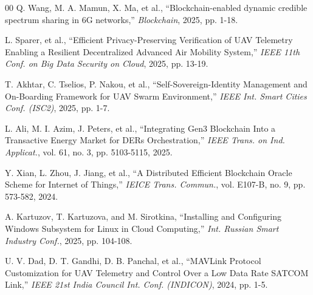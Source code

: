 \documentclass[preprint,12pt]{elsarticle}
\begin{document}
\begin{thebibliography}{00}
 Q. Wang, M. A. Mamun, X. Ma, et al., ``Blockchain-enabled dynamic credible spectrum sharing in 6G networks,'' \textit{Blockchain}, 2025, pp. 1-18.

 L. Sparer, et al., ``Efficient Privacy-Preserving Verification of UAV Telemetry Enabling a Resilient Decentralized Advanced Air Mobility System,'' \textit{IEEE 11th Conf. on Big Data Security on Cloud}, 2025, pp. 13-19.

 T. Akhtar, C. Tselios, P. Nakou, et al., ``Self-Sovereign-Identity Management and On-Boarding Framework for UAV Swarm Environment,'' \textit{IEEE Int. Smart Cities Conf. (ISC2)}, 2025, pp. 1-7.

 L. Ali, M. I. Azim, J. Peters, et al., ``Integrating Gen3 Blockchain Into a Transactive Energy Market for DERs Orchestration,'' \textit{IEEE Trans. on Ind. Applicat.}, vol. 61, no. 3, pp. 5103-5115, 2025.

 Y. Xian, L. Zhou, J. Jiang, et al., ``A Distributed Efficient Blockchain Oracle Scheme for Internet of Things,'' \textit{IEICE Trans. Commun.}, vol. E107-B, no. 9, pp. 573-582, 2024.

 A. Kartuzov, T. Kartuzova, and M. Sirotkina, ``Installing and Configuring Windows Subsystem for Linux in Cloud Computing,'' \textit{Int. Russian Smart Industry Conf.}, 2025, pp. 104-108.

 U. V. Dad, D. T. Gandhi, D. B. Panchal, et al., ``MAVLink Protocol Customization for UAV Telemetry and Control Over a Low Data Rate SATCOM Link,'' \textit{IEEE 21st India Council Int. Conf. (INDICON)}, 2024, pp. 1-5.

\end{thebibliography}
\end{document}
